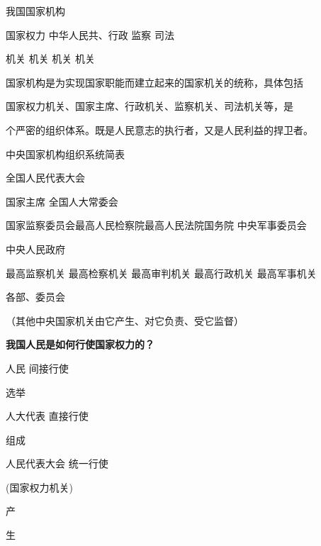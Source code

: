 \documentclass[lang=cn,11pt]{elegantbook}
\begin{document}
我国国家机构\par

国家权力 中华人民共、行政 监察 司法\par

机关 机关 机关 机关\par

国家机构是为实现国家职能而建立起来的国家机关的统称，具体包括\par

国家权力机关、国家主席、行政机关、监察机关、司法机关等，是\par

个严密的组织体系。既是人民意志的执行者，又是人民利益的捍卫者。\par

中央国家机构组织系统简表\par

全国人民代表大会\par

国家主席 全国人大常委会\par

国家监察委员会最高人民检察院最高人民法院国务院 中央军事委员会\par

中央人民政府\par

最高监察机关 最高检察机关 最高审判机关 最高行政机关 最高军事机关\par

各部、委员会\par

（其他中央国家机关由它产生、对它负责、受它监督）\par

\textbf{我国人民是如何行使国家权力的？}\par

人民 间接行使\par

选举\par

人大代表 直接行使\par

组成\par

人民代表大会 统一行使\par

(国家权力机关)\par

产\par

生\par
\end{document}
